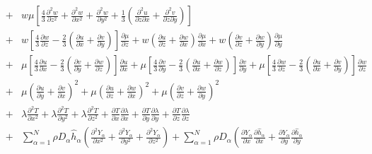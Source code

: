 \documentclass[dvips]{article}
\begin{document}
\begin{eqnarray}
& + & w\mu\left[
\frac{4}{3}\frac{\partial^{2}w}{\partial z^{2}}
          +\frac{\partial^{2}w}{\partial x^{2}}
          +\frac{\partial^{2}w}{\partial y^{2}}
+\frac{1}{3}\left(
 \frac{\partial^{2}u}{\partial z\partial x}
+\frac{\partial^{2}v}{\partial z\partial y}
            \right)
\right]\nonumber\\
& + & w\left[
\frac{4}{3}\frac{\partial w}{\partial z}
-\frac{2}{3}\left(
 \frac{\partial u}{\partial x}
+\frac{\partial v}{\partial y}
            \right)
      \right]\frac{\partial \mu}{\partial z}
+w\left(
 \frac{\partial u}{\partial z}
+\frac{\partial w}{\partial x}
 \right)\frac{\partial \mu}{\partial x}
+w\left(
 \frac{\partial v}{\partial z}
+\frac{\partial w}{\partial y}
 \right)\frac{\partial \mu}{\partial y}\nonumber\\
& + & \mu\left[
\frac{4}{3}\frac{\partial u}{\partial x}
-\frac{2}{3}\left(
 \frac{\partial v}{\partial y}
+\frac{\partial w}{\partial z}
            \right)
      \right]\frac{\partial u}{\partial x}
+ \mu\left[
\frac{4}{3}\frac{\partial v}{\partial y}
-\frac{2}{3}\left(
 \frac{\partial u}{\partial x}
+\frac{\partial w}{\partial z}
            \right)
      \right]\frac{\partial v}{\partial y}
+ \mu\left[
\frac{4}{3}\frac{\partial w}{\partial z}
-\frac{2}{3}\left(
 \frac{\partial u}{\partial x}
+\frac{\partial v}{\partial y}
            \right)
      \right]\frac{\partial w}{\partial z}\nonumber\\
& + & \mu\left(
 \frac{\partial u}{\partial y}
+\frac{\partial v}{\partial x}
 \right)^{2}
     +\mu\left(
 \frac{\partial u}{\partial z}
+\frac{\partial w}{\partial x}
 \right)^{2}
     +\mu\left(
 \frac{\partial v}{\partial z}
+\frac{\partial w}{\partial y}
 \right)^{2}\nonumber\\
& + & \lambda\frac{\partial^{2} T}{\partial x^{2}}
     +\lambda\frac{\partial^{2} T}{\partial y^{2}}
     +\lambda\frac{\partial^{2} T}{\partial z^{2}}
     +\frac{\partial T}{\partial x}\frac{\partial\lambda}{\partial x}
     +\frac{\partial T}{\partial y}\frac{\partial\lambda}{\partial y}
     +\frac{\partial T}{\partial z}\frac{\partial\lambda}{\partial z}
\nonumber\\
& + & \sum_{\alpha=1}^{N}\rho D_{\alpha}\hat{h}_{\alpha}
\left(
 \frac{\partial^{2} Y_{\alpha}}{\partial x^{2}}
+\frac{\partial^{2} Y_{\alpha}}{\partial y^{2}}
+\frac{\partial^{2} Y_{\alpha}}{\partial z^{2}}
\right)
+ \sum_{\alpha=1}^{N}\rho D_{\alpha}
\left(
 \frac{\partial Y_{\alpha}}{\partial x}\frac{\partial \hat{h}_{\alpha}}{\partial x}
+\frac{\partial Y_{\alpha}}{\partial y}\frac{\partial \hat{h}_{\alpha}}{\partial y}

\end{eqnarray}
\end{document}

